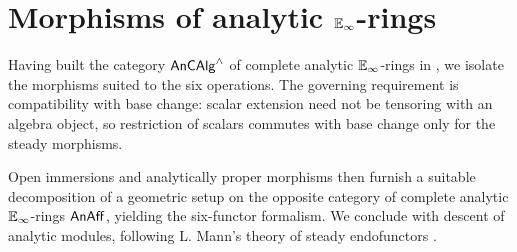 \section{Morphisms of analytic \texorpdfstring{$\mathbb{E}_{\infty}$}{E-infinity}-rings}\label{sec: morphisms of analytic rings}
Having built the category $\mathsf{An}\mathsf{CAlg}^{\wedge}$ of complete analytic $\mathbb{E}_{\infty}$-rings in , we isolate the morphisms suited to the six operations. The governing requirement is compatibility with base change: scalar extension need not be tensoring with an algebra object, so restriction of scalars commutes with base change only for the steady morphisms. 

Open immersions and analytically proper morphisms then furnish a suitable decomposition of a geometric setup on the opposite category of complete analytic $\mathbb{E}_{\infty}$-rings $\mathsf{An}\mathsf{Aff}$, yielding the six-functor formalism. We conclude with descent of analytic modules, following L. Mann's theory of steady endofunctors \cite[\S 2.5-2.6]{MannRigid6FF}.
